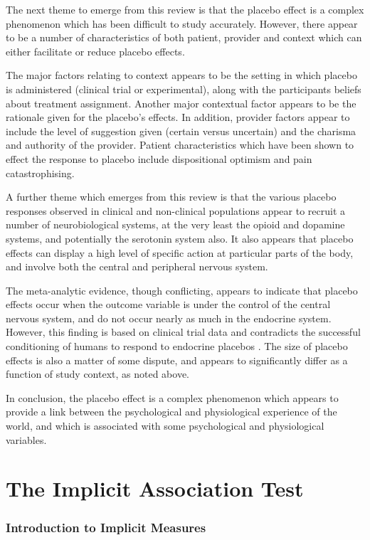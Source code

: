 The next theme to emerge from this review is that the placebo effect is a complex phenomenon which has been difficult to study accurately. However, there appear to be a number of characteristics of both patient, provider and context which can either  facilitate or reduce placebo effects.  

The major factors relating to context appears to be the setting in which placebo is administered (clinical trial or experimental), along with the participants beliefs about treatment assignment. Another major contextual factor appears to be the rationale given for the placebo's effects.  In addition, provider factors appear to include the level of suggestion given (certain versus uncertain) and the charisma and authority of the provider. Patient characteristics which have been shown to effect the response to placebo include dispositional optimism and pain catastrophising. 

A further theme which emerges from this review is that the various placebo responses observed in clinical and non-clinical populations appear to recruit a number of neurobiological systems, at the very least the opioid and dopamine systems, and potentially the serotonin system also. It also appears that placebo effects can display a high level of specific action at particular parts of the body, and involve both the central and peripheral nervous system. 

The meta-analytic evidence, though conflicting, appears to indicate that placebo effects occur when the outcome variable is under the control of the central nervous system, and do not occur nearly as much in the endocrine system. However, this finding is based on clinical trial data and contradicts the successful conditioning of humans to respond to endocrine placebos \cite{Benedetti2003a}. The size of placebo effects is also a matter of some dispute, and appears to significantly differ as a function of study context, as noted above. 

In conclusion, the placebo effect is a complex phenomenon which appears to provide a link between the psychological and physiological  experience of the world, and which is associated  with some psychological and physiological variables. 


\part{The Implicit Association Test}
\label{part:impl-assoc-test}

\section{Introduction to Implicit Measures}
\label{sec:intr-impl-meas}

